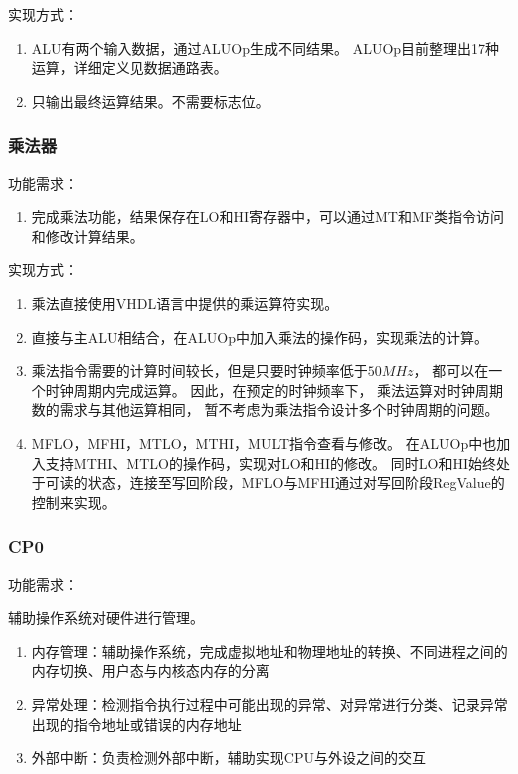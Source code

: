             实现方式：
            \begin{enumerate}
            \item
            ALU有两个输入数据，通过ALUOp生成不同结果。%
            ALUOp目前整理出17种运算，详细定义见数据通路表。
            \item
            只输出最终运算结果。不需要标志位。
            \end{enumerate}

        \subsubsection{乘法器}
            功能需求：
            \begin{enumerate}
            \item
            完成乘法功能，结果保存在LO和HI寄存器中，可以通过MT和MF类指令访问和修改计算结果。
            \end{enumerate}

            实现方式：
            \begin{enumerate}
            \item
            乘法直接使用VHDL语言中提供的乘运算符实现。
            \item
            直接与主ALU相结合，在ALUOp中加入乘法的操作码，实现乘法的计算。
            \item
            乘法指令需要的计算时间较长，但是只要时钟频率低于$50MHz$，%
            都可以在一个时钟周期内完成运算。%
            因此，在预定的时钟频率下，%
            乘法运算对时钟周期数的需求与其他运算相同，%
            暂不考虑为乘法指令设计多个时钟周期的问题。
            \item
            MFLO，MFHI，MTLO，MTHI，MULT指令查看与修改。
            在ALUOp中也加入支持MTHI、MTLO的操作码，实现对LO和HI的修改。
            同时LO和HI始终处于可读的状态，连接至写回阶段，MFLO与MFHI通过对写回阶段RegValue的控制来实现。
            \end{enumerate}

        \subsubsection{CP0}
            功能需求：

            辅助操作系统对硬件进行管理。
            \begin{enumerate}
            \item
                内存管理：辅助操作系统，完成虚拟地址和物理地址的转换、不同进程之间的内存切换、用户态与内核态内存的分离
            \item
                异常处理：检测指令执行过程中可能出现的异常、对异常进行分类、记录异常出现的指令地址或错误的内存地址
            \item
                外部中断：负责检测外部中断，辅助实现CPU与外设之间的交互

            \end{enumerate}


